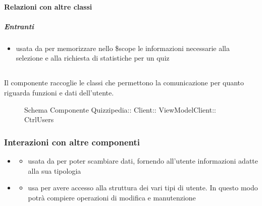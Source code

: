 \paragraph{Relazioni con altre classi}
\subparagraph{Entranti}
\begin{itemize}
\item usata da  per memorizzare nello \$scope le informazioni necessarie alla selezione e alla richiesta di statistiche per un quiz
\end{itemize}
\subsection{}
Il componente raccoglie le classi che permettono la comunicazione per quanto riguarda funzioni e dati dell'utente.
\begin{figure}[H]
\centering
\noindent{}
\caption[Schema Componente CtrlUsers]{Schema Componente Quizzipedia:: Client:: ViewModelClient:: CtrlUsers}
\end{figure}
\subsubsection{Interazioni con altre componenti}
\begin{itemize}
\item {}
\begin{itemize}
\item usata da  per poter scambiare dati, fornendo all'utente informazioni adatte alla sua tipologia
\end{itemize}
\item {}
\begin{itemize}
\item usa  per avere accesso alla struttura dei vari tipi di utente. In questo modo potrà compiere operazioni di modifica e manutenzione
\end{itemize}
\end{itemize}
